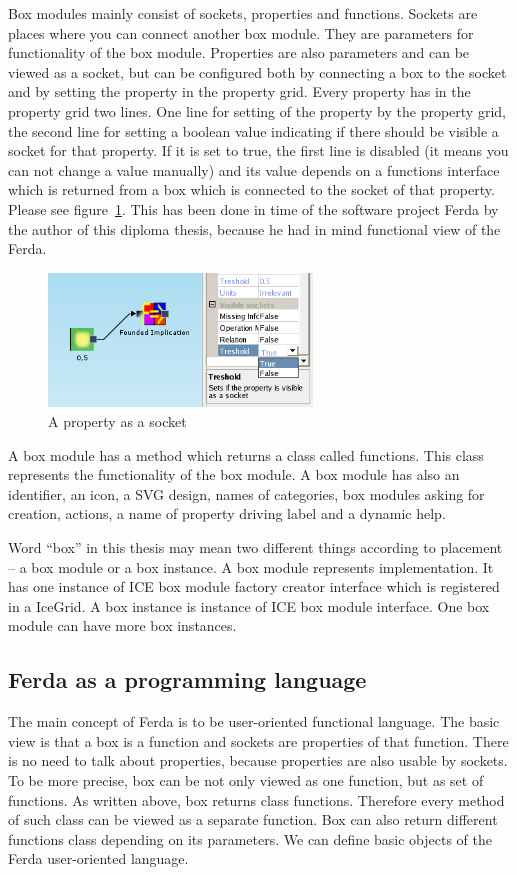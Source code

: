\documentclass[a4paper,12pt]{book}
\begin{document}
Box modules mainly consist of sockets, properties and functions. Sockets are places where you can connect another box module. They are parameters for functionality of the box module. Properties are also parameters and can be viewed as a socket, but can be configured both by connecting a box to the socket and by setting the property in the property grid. Every property has in the property grid two lines. One line for setting of the property by the property grid, the second line for setting a boolean value indicating if there should be visible a socket for that property. If it is set to true, the first line is disabled (it means you can not change a value manually) and its value depends on a functions interface which is returned from a box which is connected to the socket of that property. Please see figure~\ref{fig:propertyAsASocket}. This has been done in time of the software project Ferda by the author of this diploma thesis, because he had in mind functional view of the Ferda. 
\begin{figure}
	\includegraphics[width=7cm]{property_as_socket}
	\caption{A property as a socket}
	\label{fig:propertyAsASocket}
\end{figure}

A box module has a method which returns a class called functions. This class represents the functionality of the box module. A box module has also an identifier, an icon, a SVG design, names of categories, box modules asking for creation, actions, a name of property driving label and a dynamic help.

Word ``box'' in this thesis may mean two different things according to placement -- a box module or a box instance. A box module represents implementation. It has one instance of ICE box module factory creator interface which is registered in a IceGrid. A box instance is instance of ICE box module interface. One box module can have more box instances.

\subsection{Ferda as a programming language}
The main concept of Ferda is to be user-oriented functional language. The basic view is that a box is a function and sockets are properties of that function. There is no need to talk about properties, because properties are also usable by sockets. To be more precise, box can be not only viewed as one function, but as set of functions. As written above, box returns class functions. Therefore every method of such class can be viewed as a separate function. Box can also return different functions class depending on its parameters. We can define basic objects of the Ferda user-oriented language.
\end{document}
